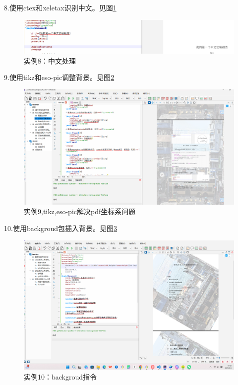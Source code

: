 \documentclass{article}
\begin{document}
	8.使用ctex和xeletax识别中文。见图\ref{fig:example10}
	
	\begin{figure}[h]  
		\centering
		\includegraphics[width=1\textwidth]{k.png}
		\caption{实例8：中文处理}
		\label{fig:example10}
	\end{figure}
	
	9.使用tikz和eso-pic调整背景。见图\ref{fig:example11}

		\begin{figure}[h]  
		\centering
		\includegraphics[width=1\textwidth]{l.png}
		\caption{实例9,tikz,eso-pic解决pdf坐标系问题}
		\label{fig:example11}
	\end{figure}
	
	\newpage
	
	10.使用backgroud包插入背景。见图\ref{fig:example12}
	
		\begin{figure}[h]  
		\centering
		\includegraphics[width=1\textwidth]{c.png}
		\caption{实例10：backgroud指令}
		\label{fig:example12}
	\end{figure}
	
\end{document}
